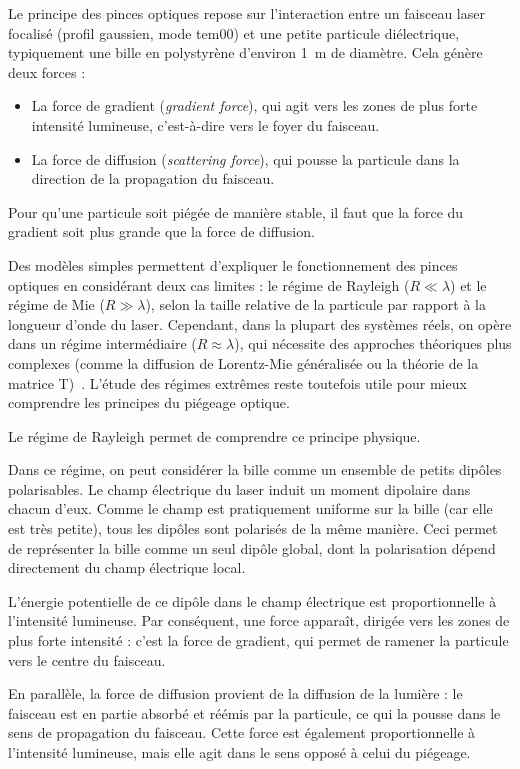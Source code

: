 Le principe des pinces optiques repose sur l'interaction entre un faisceau laser focalisé (profil gaussien, mode \gls{tem00}) et une petite particule diélectrique, typiquement une bille en polystyrène d'environ 1~\textmu m de diamètre. Cela génère deux forces :
\begin{itemize}[label=\textbullet]
    \item La force de gradient (\textit{gradient force}), qui agit vers les zones de plus forte intensité lumineuse, c'est-à-dire vers le foyer du faisceau.
    \item La force de diffusion (\textit{scattering force}), qui pousse la particule dans la direction de la propagation du faisceau.
\end{itemize}
Pour qu'une particule soit piégée de manière stable, il faut que la force du gradient soit plus grande que la force de diffusion.

Des modèles simples permettent d'expliquer le fonctionnement des pinces optiques en considérant deux cas limites : le régime de Rayleigh ($R \ll \lambda$) et le régime de Mie ($R \gg \lambda$), selon la taille relative de la particule par rapport à la longueur d'onde du laser.
Cependant, dans la plupart des systèmes réels, on opère dans un régime intermédiaire ($R \approx \lambda$), qui nécessite des approches théoriques plus complexes (comme la diffusion de Lorentz-Mie généralisée ou la théorie de la matrice T)~\cite{epflExplanationOpticalTweezers}.
L'étude des régimes extrêmes reste toutefois utile pour mieux comprendre les principes du piégeage optique.

Le régime de Rayleigh permet de comprendre ce principe physique.

Dans ce régime, on peut considérer la bille comme un ensemble de petits dipôles polarisables. Le champ électrique du laser induit un moment dipolaire dans chacun d'eux. Comme le champ est pratiquement uniforme sur la bille (car elle est très petite), tous les dipôles sont polarisés de la même manière. Ceci permet de représenter la bille comme un seul dipôle global, dont la polarisation dépend directement du champ électrique local.

L'énergie potentielle de ce dipôle dans le champ électrique est proportionnelle à l'intensité lumineuse. Par conséquent, une force apparaît, dirigée vers les zones de plus forte intensité : c'est la force de gradient, qui permet de ramener la particule vers le centre du faisceau.

En parallèle, la force de diffusion provient de la diffusion de la lumière : le faisceau est en partie absorbé et réémis par la particule, ce qui la pousse dans le sens de propagation du faisceau. Cette force est également proportionnelle à l'intensité lumineuse, mais elle agit dans le sens opposé à celui du piégeage.


